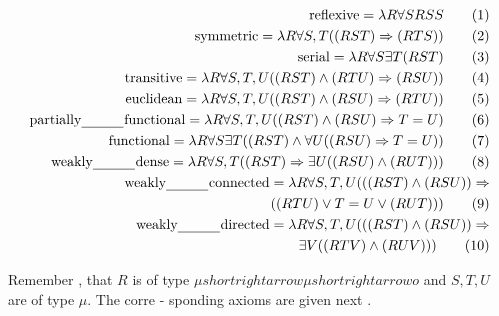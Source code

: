 \documentclass[10pt]{article}
\begin{document}
\begin{align*}
 \mathrm{re fl exive}   =   \lambda  R   \forall  S   R  S   S \tag*{$ (  1  ) $}\\ \mathrm{symmetric}   =   \lambda  R   \forall  S  ,   T   (  (  R   S  T  )   \Rightarrow   (  RT   S  )  ) \tag*{$ (  2  ) $}\\ \mathrm{serial}   =   \lambda  R   \forall  S   \exists  T   (  R   S  T  ) \tag*{$ (  3  ) $}\\ \mathrm{transitive}   =   \lambda  R   \forall  S  ,   T  ,   U   (  (  R   S  T  )   \wedge   (  R  T   U  )   \Rightarrow   (  R  S   U  )  ) \tag*{$ (  4  ) $}\\ \mathrm{euclidean}   =   \lambda  R   \forall  S  ,   T  ,   U   (  (  R   S  T  )   \wedge   (  R   S   U  )   \Rightarrow   (  R  T   U  )  ) \tag*{$ (  5  ) $}\\ \mathrm{partially} _{ \rule{3em}{0.4pt} } \mathrm{functional}   =   \lambda  R   \forall  S  ,   T  ,   U   (  (  R   S  T  )   \wedge   (  R   S   U  )   \Rightarrow   T   =   U  ) \tag*{$ (  6  ) $}\\ \mathrm{functional}   =   \lambda  R   \forall  S   \exists  T   (  (  R   S  T  )   \wedge   \forall  U   (  (  R  S   U  )   \Rightarrow   T   =   U  )  ) \tag*{$ (  7  ) $}\\ \mathrm{weakly} _{ \rule{3em}{0.4pt} } \mathrm{dense}   =   \lambda  R   \forall  S  ,   T   (  (  R   S  T  )   \Rightarrow   \exists  U   (  (  R   S   U  )   \wedge   (  R   U   T  )  )  ) \tag*{$ (  8  ) $}\\ \mathrm{weakly} _{ \rule{3em}{0.4pt} } \mathrm{connected}   =   \lambda  R   \forall  S  ,   T  ,   U   (  (  (  R   S  T  )   \wedge   (  R   S   U  )  )   \Rightarrow \\ (  (  R  T   U  )   \vee   T   =   U   \vee   (  R   U   T  )  )  ) \tag*{$ (  9  ) $}\\ \mathrm{weakly} _{ \rule{3em}{0.4pt} } \mathrm{directed}   =   \lambda  R   \forall  S  ,   T  ,   U   (  (  (  R   S  T  )   \wedge   (  R   S   U  )  )   \Rightarrow \\ \exists  V   (  (  R  T   V  )   \wedge   (  R   U   V  )  )  ) \tag*{$ (  1  0  ) $}
\end{align*}

\noindent Remember , that  $ R $  is of type  $ \mu   shortrightarrow   \mu   shortrightarrow   o $  and  $ S  ,   T  ,   U $  are of type  $ \mu  . $  The corre - 
 sponding axioms are given next . 
\end{document}
